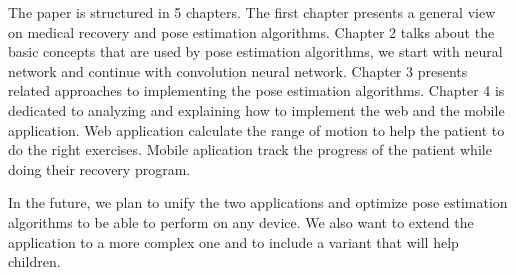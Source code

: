 The paper is structured in 5 chapters.
The first chapter presents a general view on medical recovery and pose estimation algorithms.
Chapter 2 talks about the basic concepts that are used by pose estimation algorithms, we start with neural network and continue with convolution neural network.
Chapter 3 presents related approaches to implementing the pose estimation algorithms.
 Chapter 4 is dedicated to analyzing and  explaining how to implement the web and the mobile application. 
Web application calculate the range of motion to help the patient to do the right exercises.
 Mobile aplication track the progress of the patient while doing their recovery program.
 

In the future, we plan to unify the two applications and optimize pose estimation algorithms to be able to perform on any device. We also want to extend the application to a more complex one and to include a variant that will help children.